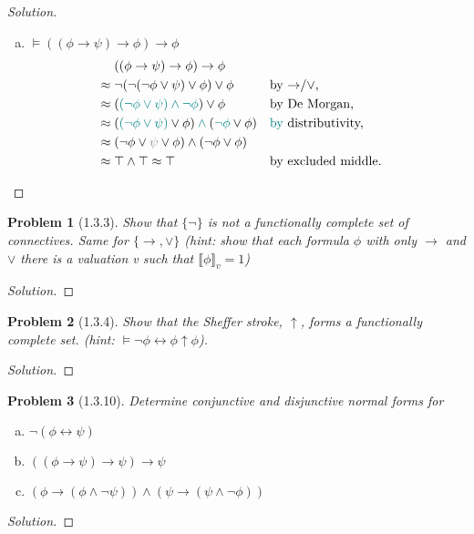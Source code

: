 \documentclass[letter]{article}
\newtheorem{problem}{Problem}
\theoremstyle{definition}
\newenvironment{solution}
{\begin{proof}[Solution]}
	{\end{proof}}
\begin{document}
\begin{solution}
\begin{enumerate}[(a)]
  \item $\models ((\phi \to \psi) \to \phi) \to \phi$
\begin{align*}
  & ((\phi \to \psi) \to \phi) \to \phi &
\\ \approx{}
  & \neg (\neg (\neg \phi \lor \psi) \lor \phi) \lor \phi
  && \text{by \tolor,}
\\ \approx{}
  & ({\color{teal}(\neg \phi \lor \psi) \land \neg \phi}) \lor \phi
  && \text{by De Morgan,}
\\ \approx{}
  & ({\color{teal}(\neg \phi \lor \psi)} \lor \phi) \colop{teal}{\land} ({\color{teal}\neg \phi} \lor \phi)
  && \text{{\color{teal}by} distributivity,}
\\ \approx{}
  & (\neg \phi \lor {\color{gray}\psi} \lor \phi) \land (\neg \phi \lor \phi)
  &&
\\ \approx{}
  & \top \land \top \approx \top
  && \text{by excluded middle.}
\end{align*}
\end{enumerate}
\end{solution}

\begin{problem}[1.3.3] Show that $\{ \neg \}$ is not a functionally complete set of connectives. Same for $\{\to, \lor\}$ (hint: show that each formula $\phi$ with only $\to$ and $\lor$ there is a valuation v such that $\llbracket \phi \rrbracket_v = 1$)
\end{problem}
\begin{solution}
\end{solution}

\begin{problem}[1.3.4] Show that the Sheffer stroke, $\uparrow$, forms a functionally complete set. (hint: $\models \neg \phi \leftrightarrow \phi \uparrow \phi$).
\end{problem}
\begin{solution}
\end{solution}


\begin{problem}[1.3.10] Determine conjunctive and disjunctive normal forms for
\begin{enumerate}[(a)]
    \item $\neg (\phi \leftrightarrow \psi)$
    \item $((\phi \to \psi) \to \psi) \to \psi$
    \item $(\phi \to (\phi \land \neg \psi)) \land (\psi \to (\psi \land \neg \phi))$
\end{enumerate}
\end{problem}
\begin{solution}
\end{solution}
\end{document}
